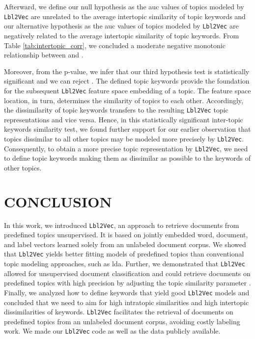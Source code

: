 \documentclass[a4paper,twoside]{article}
\begin{document}
Afterward, we define our null hypothesis  as the \ac{auc} values of topics modeled by \texttt{Lbl2Vec} are unrelated to the average intertopic similarity of topic keywords and our alternative hypothesis  as the \ac{auc} values of topics modeled by \texttt{Lbl2Vec} are negatively related to the average intertopic similarity of topic keywords. From Table \ref{tab:intertopic_corr}, we concluded a moderate negative monotonic relationship between  and .
\begin{table}[ht]
\centering
{}\caption{\label{tab:intertopic_corr} Correlation values that measure the relationship between  average intertopic similarity of topic keywords and  value of a topic.  and .}
\end{table}
Moreover, from the p-value, we infer that our third hypothesis test is statistically significant and we can reject . The defined topic keywords provide the foundation for the subsequent \texttt{Lbl2Vec} feature space embedding of a topic. The feature space location, in turn, determines the similarity of topics to each other. Accordingly, the dissimilarity of topic keywords transfers to the resulting \texttt{Lbl2Vec} topic representations and vice versa. Hence, in this statistically significant inter-topic keywords similarity test, we found further support for our earlier observation that topics dissimilar to all other topics may be modeled more precisely by \texttt{Lbl2Vec}. Consequently, to obtain a more precise topic representation by \texttt{Lbl2Vec}, we need to define topic keywords making them as dissimilar as possible to the keywords of other topics. \newline

\section{\uppercase{Conclusion}}
\label{sec:conclusion}

In this work, we introduced \texttt{Lbl2Vec}, an approach to retrieve documents from predefined topics unsupervised. It is based on jointly embedded word, document, and label vectors learned solely from an unlabeled document corpus. We showed that \texttt{Lbl2Vec} yields better fitting models of predefined topics than conventional topic modeling approaches, such as \ac{lda}. Further, we demonstrated that \texttt{Lbl2Vec} allowed for unsupervised document classification and could retrieve documents on predefined topics with high precision by adjusting the topic similarity parameter . Finally, we analyzed how to define keywords that yield good \texttt{Lbl2Vec} models and concluded that we need to aim for high intratopic similarities and high intertopic dissimilarities of keywords. \texttt{Lbl2Vec} facilitates the retrieval of documents on predefined topics from an unlabeled document corpus, avoiding costly labeling work. We made our \texttt{Lbl2Vec} code as well as the data publicly available.
\end{document}
